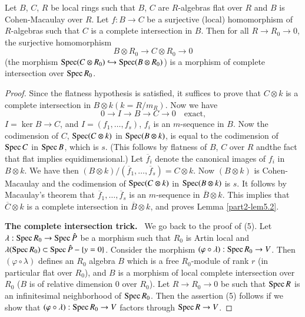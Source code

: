 \begin{lemma}\label{part2-lem5.2}
Let $B$, $C$, $R$ be local rings such that $B$, $C$ are $R$-algebras
flat over $R$ and $B$ is Cohen-Macaulay over $R$. Let $f:B\to C$ be a
surjective (local) homomorphism of $R$-algebras such that $C$ is a
complete intersection in $B$. Then for all $R\to R_{0}\to 0$, the
surjective homomorphism
$$
B\otimes R_{0}\to C\otimes R_{0}\to 0
$$
(the morphism $\operatorname{Spec} (C\otimes R_{0})\hookrightarrow \operatorname{Spec} (B\otimes
R_{0})$) is a morphism of complete intersection over $\operatorname{Spec} R_{0}$.
\end{lemma}

\begin{proof}
Since the flatness hypothesis is satisfied, it suffices to prove that
$C\otimes k$ is a complete intersection in $B\otimes
k(k=R/m_{R})$. Now we have
$$
0\to I\to B\to C\to 0\quad\text{exact,}
$$
$I=\ker B\to C$, and $I=(f_{1},\ldots,f_{s})$, $f_{i}$ is an
$m$-sequence in $B$. Now the codimension of $C$, $\operatorname{Spec} (C\otimes k)$
in $\operatorname{Spec} (B\otimes k)$, is equal to the codimension of $\operatorname{Spec} C$ in
$\operatorname{Spec} B$, which is $s$. (This follows by flatness of $B$, $C$ over
$R$ and\pageoriginale the fact that flat implies equidimensional.) Let
$\overline{f}_{i}$ denote the canonical images of $f_{i}$ in $B\otimes
k$. We have then $(B\otimes
k)/(\overline{f}_{1},\ldots,\overline{f}_{s})=C\otimes k$. Now
$(B\otimes k)$ is Cohen-Macaulay and the codimension of $\operatorname{Spec}
(C\otimes k)$ in $\operatorname{Spec}(B\otimes k)$ is $s$. It follows by Macaulay's
theorem that $\overline{f}_{1},\ldots,\overline{f}_{s}$ is an
$m$-sequence in $\overline{B}\otimes k$. This implies that
$\overline{C}\otimes k$ is a complete intersection in
$\overline{B}\otimes k$, and proves Lemma \ref{part2-lem5.2}.

\smallskip
\noindent
{\bf The complete intersection trick.}~
We go back to the proof of (5). Let $\lambda:\operatorname{Spec} R_{0}\to \operatorname{Spec}
\hat{P}$ be a morphism such that $R_{0}$ is Artin local and
$\lambda(\operatorname{Spec} R_{0})\subset \operatorname{Spec} \hat{P}-\{y=0\}$. Consider the
morphism $(\varphi\circ \lambda):\operatorname{Spec} R_{0}\to V$. Then
$(\varphi\circ \lambda)$ defines an $R_{0}$ algebra $B$ which is a
free $R_{0}$-module of rank $r$ (in particular flat over $R_{0}$), and
$B$ is a morphism of local complete intersection over $R_{0}$ ($B$ is
of relative dimension $0$ over $R_{0}$). Let $R\to R_{0}\to 0$ be such
that $\operatorname{Spec} R$ is an infinitesimal neighborhood of $\operatorname{Spec} R_{0}$. Then
the assertion (5) follows if we show that $(\varphi\circ\lambda):\operatorname{Spec}
R_{0}\to V$ factors through $\operatorname{Spec} R\to V$.


\end{proof}
